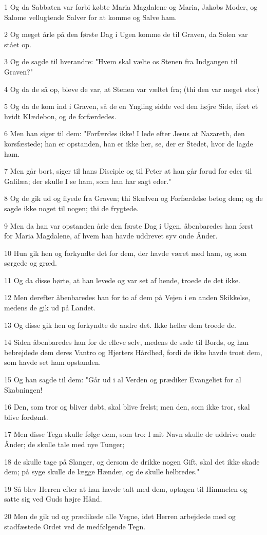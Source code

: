 \par 1 Og da Sabbaten var forbi købte Maria Magdalene og Maria, Jakobs Moder, og Salome vellugtende Salver for at komme og Salve ham.
\par 2 Og meget årle på den første Dag i Ugen komme de til Graven, da Solen var stået op.
\par 3 Og de sagde til hverandre: "Hvem skal vælte os Stenen fra Indgangen til Graven?"
\par 4 Og da de så op, bleve de var, at Stenen var væltet fra; (thi den var meget stor)
\par 5 Og da de kom ind i Graven, så de en Yngling sidde ved den højre Side, iført et hvidt Klædebon, og de forfærdedes.
\par 6 Men han siger til dem: "Forfærdes ikke! I lede efter Jesus at Nazareth, den korsfæstede; han er opstanden, han er ikke her, se, der er Stedet, hvor de lagde ham.
\par 7 Men går bort, siger til hans Disciple og til Peter at han går forud for eder til Galilæa; der skulle I se ham, som han har sagt eder."
\par 8 Og de gik ud og flyede fra Graven; thi Skælven og Forfærdelse betog dem; og de sagde ikke noget til nogen; thi de frygtede.
\par 9 Men da han var opstanden årle den første Dag i Ugen, åbenbaredes han først for Maria Magdalene, af hvem han havde uddrevet syv onde Ånder.
\par 10 Hun gik hen og forkyndte det for dem, der havde været med ham, og som sørgede og græd.
\par 11 Og da disse hørte, at han levede og var set af hende, troede de det ikke.
\par 12 Men derefter åbenbaredes han for to af dem på Vejen i en anden Skikkelse, medens de gik ud på Landet.
\par 13 Og disse gik hen og forkyndte de andre det. Ikke heller dem troede de.
\par 14 Siden åbenbaredes han for de elleve selv, medens de sade til Bords, og han bebrejdede dem deres Vantro og Hjerters Hårdhed, fordi de ikke havde troet dem, som havde set ham opstanden.
\par 15 Og han sagde til dem: "Går ud i al Verden og prædiker Evangeliet for al Skabningen!
\par 16 Den, som tror og bliver døbt, skal blive frelst; men den, som ikke tror, skal blive fordømt.
\par 17 Men disse Tegn skulle følge dem, som tro: I mit Navn skulle de uddrive onde Ånder; de skulle tale med nye Tunger;
\par 18 de skulle tage på Slanger, og dersom de drikke nogen Gift, skal det ikke skade dem; på syge skulle de lægge Hænder, og de skulle helbredes."
\par 19 Så blev Herren efter at han havde talt med dem, optagen til Himmelen og satte sig ved Guds højre Hånd.
\par 20 Men de gik ud og prædikede alle Vegne, idet Herren arbejdede med og stadfæstede Ordet ved de medfølgende Tegn.



